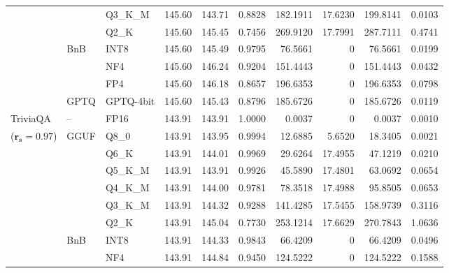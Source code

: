 \begin{longtable}{ll l rrrrrrr}
 &  & Q3\_K\_M & 145.60 & 143.71 & \cellcolor{red!18} 0.8828 & \cellcolor{red!18} 182.1911 & 17.6230 & \cellcolor{red!18} 199.8141 & \cellcolor{red!18} 0.0103 \\
 &  & Q2\_K & 145.60 & 145.45 & \cellcolor{red!35} 0.7456 & \cellcolor{red!35} 269.9120 & 17.7991 & \cellcolor{red!35} 287.7111 & \cellcolor{red!35} 0.4741 \\
 & BnB & INT8 & 145.60 & 145.49 & 0.9795 & 76.5661 & \cellcolor{cyan!12} $0$ & 76.5661 & 0.0199 \\
 &  & NF4 & 145.60 & 146.24 & \cellcolor{red!18} 0.9204 & \cellcolor{red!18} 151.4443 & \cellcolor{cyan!12} $0$ & \cellcolor{red!18} 151.4443 & \cellcolor{red!18} 0.0432 \\
 &  & FP4 & 145.60 & 146.18 & \cellcolor{red!18} 0.8657 & \cellcolor{red!18} 196.6353 & \cellcolor{cyan!12} $0$ & \cellcolor{red!18} 196.6353 & \cellcolor{red!18} 0.0798 \\
 & GPTQ & GPTQ-4bit & 145.60 & 145.43 & \cellcolor{red!18} 0.8796 & \cellcolor{red!18} 185.6726 & \cellcolor{cyan!12} $0$ & \cellcolor{red!18} 185.6726 & \cellcolor{red!18} 0.0119 \\
\midrule
TriviaQA & -- & FP16 & 143.91 & 143.91 & 1.0000 & 0.0037 & \cellcolor{cyan!12} $0$ & 0.0037 & 0.0010 \\
{\small ($\mathbf{r_s{=}0.97}$)} & GGUF & Q8\_0 & 143.91 & 143.95 & 0.9994 & 12.6885 & 5.6520 & 18.3405 & 0.0021 \\
 &  & Q6\_K & 143.91 & 144.01 & 0.9969 & 29.6264 & 17.4955 & 47.1219 & 0.0210 \\
 &  & Q5\_K\_M & 143.91 & 143.91 & 0.9926 & 45.5890 & 17.4801 & 63.0692 & 0.0654 \\
 &  & Q4\_K\_M & 143.91 & 144.00 & 0.9781 & 78.3518 & 17.4988 & 95.8505 & 0.0653 \\
 &  & Q3\_K\_M & 143.91 & 144.32 & \cellcolor{red!18} 0.9288 & \cellcolor{red!18} 141.4285 & 17.5455 & \cellcolor{red!18} 158.9739 & \cellcolor{red!18} 0.3116 \\
 &  & Q2\_K & 143.91 & 145.04 & \cellcolor{red!35} 0.7730 & \cellcolor{red!35} 253.1214 & 17.6629 & \cellcolor{red!35} 270.7843 & \cellcolor{red!35} 1.0636 \\
 & BnB & INT8 & 143.91 & 144.33 & 0.9843 & 66.4209 & \cellcolor{cyan!12} $0$ & 66.4209 & 0.0496 \\
 &  & NF4 & 143.91 & 144.84 & \cellcolor{red!18} 0.9450 & \cellcolor{red!18} 124.5222 & \cellcolor{cyan!12} $0$ & \cellcolor{red!18} 124.5222 & \cellcolor{red!18} 0.1588 \\

\end{longtable}
